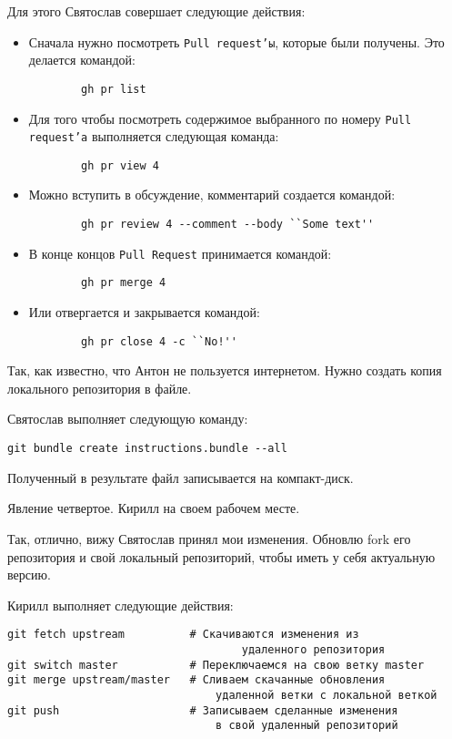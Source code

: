 \documentclass[14pt,a4paper]{article}
\begin{document}
Для этого Святослав совершает следующие действия:
\begin{itemize}
	\item Сначала нужно посмотреть \texttt{Pull request'ы}, которые были получены.
		Это делается командой:
		\begin{verbatim}
		gh pr list
		\end{verbatim}
	\item Для того чтобы посмотреть содержимое выбранного по номеру \texttt{Pull request'а}
		выполняется следующая команда:
		\begin{verbatim}
		gh pr view 4
		\end{verbatim}
	\item Можно вступить в обсуждение, комментарий создается командой:
		\begin{verbatim}
		gh pr review 4 --comment --body ``Some text''
		\end{verbatim}
	\item В конце концов \texttt{Pull Request} принимается командой:
		\begin{verbatim}
		gh pr merge 4 
		\end{verbatim}
	\item Или отвергается и закрывается командой:
		\begin{verbatim}
		gh pr close 4 -c ``No!''
		\end{verbatim}
\end{itemize}
Так, как известно, что Антон не пользуется интернетом. Нужно создать копия локального 
репозитория в файле. 

Святослав выполняет следующую команду:

\begin{verbatim}
git bundle create instructions.bundle --all
\end{verbatim}

Полученный в результате файл записывается на компакт-диск.

Явление четвертое.
Кирилл на своем рабочем месте. 

 Так, отлично, вижу Святослав принял мои изменения. Обновлю fork его 
репозитория и свой локальный репозиторий, чтобы иметь у себя актуальную версию.

Кирилл выполняет следующие действия:
\begin{verbatim}
git fetch upstream			# Скачиваются изменения из 
									удаленного репозитория
git switch master			# Переключаемся на свою ветку master
git merge upstream/master	# Сливаем скачанные обновления 
								удаленной ветки с локальной веткой
git push					# Записываем сделанные изменения
								в свой удаленный репозиторий
\end{verbatim}
\end{document}
